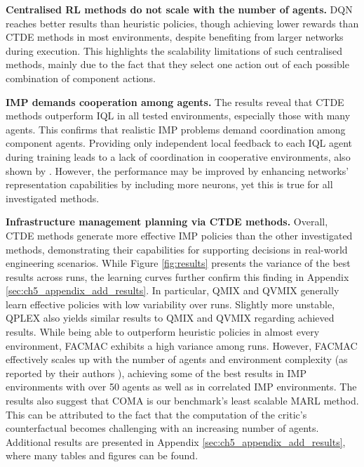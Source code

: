 \textbf{Centralised RL methods do not scale with the number of agents.}
DQN reaches better results than heuristic policies, though achieving lower rewards than CTDE methods in most environments, despite benefiting from larger networks during execution.
This highlights the scalability limitations of such centralised methods, mainly due to the fact that they select one action out of each possible combination of component actions.

\textbf{IMP demands cooperation among agents.}
The results reveal that CTDE methods outperform IQL in all tested environments, especially those with many agents.
This confirms that realistic IMP problems demand coordination among component agents.
Providing only independent local feedback to each IQL agent during training leads to a lack of coordination in cooperative environments, also shown by \cite{Rashid2018}. 
However, the performance may be improved by enhancing networks' representation capabilities by including more neurons, yet this is true for all investigated methods.

\textbf{Infrastructure management planning via CTDE methods.}
Overall, CTDE methods generate more effective IMP policies than the other investigated methods, demonstrating their capabilities for supporting decisions in real-world engineering scenarios.
While Figure \ref{fig:results} presents the variance of the best results across runs, the learning curves further confirm this finding in Appendix \ref{sec:ch5_appendix_add_results}.
In particular, QMIX and QVMIX generally learn effective policies with low variability over runs. 
Slightly more unstable, QPLEX also yields similar results to QMIX and QVMIX regarding achieved results.
While being able to outperform heuristic policies in almost every environment, FACMAC exhibits a high variance among runs.
However, FACMAC effectively scales up with the number of agents and environment complexity (as reported by their authors \citep{peng2021facmac}), achieving some of the best results in IMP environments with over 50 agents as well as in correlated IMP environments.
The results also suggest that COMA is our benchmark's least scalable MARL method.
This can be attributed to the fact that the computation of the critic's counterfactual becomes challenging with an increasing number of agents.
Additional results are presented in Appendix \ref{sec:ch5_appendix_add_results}, where many tables and figures can be found.

